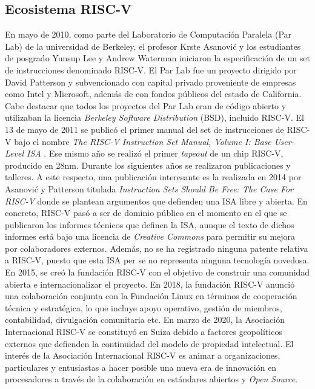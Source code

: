 \subsection{Ecosistema RISC-V}

\label{eco-risc}

En mayo de 2010, como parte del Laboratorio de Computación Paralela (Par Lab) de la universidad de Berkeley, el profesor Krste Asanović y los estudiantes de posgrado Yunsup Lee y Andrew Waterman iniciaron la especificación de un set de instrucciones denominado RISC-V.
El Par Lab fue un proyecto dirigido por David Patterson y subvencionado con capital privado proveniente de empresas como Intel y Microsoft, además de con fondos públicos del estado de California.
Cabe destacar que todos los proyectos del Par Lab eran de código abierto y utilizaban la licencia \textit{Berkeley Software Distribution} (BSD), incluido RISC-V.
El 13 de mayo de 2011 se publicó el primer manual del set de instrucciones de RISC-V bajo el nombre \textit{The RISC-V Instruction Set Manual, Volume I: Base User-Level ISA} \cite{manual-riscv}.
Ese mismo año se realizó el primer \textit{tapeout} de un chip RISC-V, producido en 28nm.
Durante los siguientes años se realizaron publicaciones y talleres.
A este respecto, una publicación interesante es la realizada en 2014 por Asanović y Patterson titulada \textit{Instruction Sets Should Be Free: The Case For RISC-V} \cite{paper-riscv} donde se plantean argumentos que defienden una ISA libre y abierta. 
En concreto, RISC-V pasó a ser de dominio público en el momento en el que se publicaron los informes técnicos que definen la ISA, aunque el texto de dichos informes está bajo una licencia de \textit{Creative Commons} para permitir su mejora por colaboradores externos.
Además, no se ha registrado ninguna patente relativa a RISC-V, puesto que esta ISA per se no representa ninguna tecnología novedosa.
En 2015, se creó la fundación RISC-V con el objetivo de construir una comunidad abierta e internacionalizar el proyecto.
En 2018, la fundación RISC-V anunció una colaboración conjunta con la Fundación Linux en términos de cooperación técnica y estratégica, lo que incluye apoyo operativo, gestión de miembros, contabilidad, divulgación comunitaria etc. 
En marzo de 2020, la Asociación Internacional RISC-V se constituyó en Suiza debido a factores geopolíticos externos que defienden la continuidad del modelo de propiedad intelectual.
El interés de la Asociación Internacional RISC-V es animar a organizaciones, particulares y entusiastas a hacer posible una nueva era de innovación en procesadores a través de la colaboración en estándares abiertos y \textit{Open Source}.

